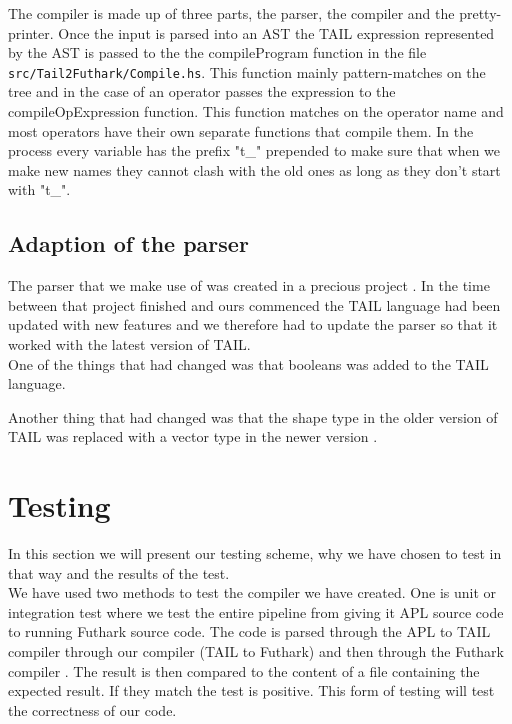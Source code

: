 \documentclass[11pt]{article}
\begin{document}
The compiler is made up of three parts, the parser, the compiler and the pretty-printer. Once the input is parsed into an AST the
TAIL expression represented by the AST is passed to the the compileProgram function in the file \\
{\tt src/Tail2Futhark/Compile.hs}.
This function mainly pattern-matches on the tree and in the case of an operator passes the expression to the compileOpExpression
function.
This function matches on the operator name and most operators have their own separate functions that compile them.
In the process every variable has the prefix "t\_" prepended to make sure that when we make new names they cannot clash
with the old ones as long as they don't start with "t\_".

\subsection{Adaption of the parser}

The parser that we make use of was created in a precious project \cite{APLACC}.
In the time between that project finished and ours commenced the TAIL language
had been updated with new features and we therefore had to update the parser so that it worked with the latest version of TAIL.\\

One of the things that had changed was that booleans was added to the TAIL language. %

Another thing that had changed was that the shape type in the older version of TAIL was replaced with a vector type in the newer version \cite{ElsmanDybdal:Array:2014}.\\

\section{Testing}
In this section we will present our testing scheme, why we have chosen to test in that way and the results of the test.\\

We have used two methods to test the compiler we have created.
One is unit or integration test where we test the entire pipeline from giving it APL source code to running Futhark source code.
The code is parsed through the APL to TAIL compiler \cite{ElsmanDybdal:Array:2014}
through our compiler (TAIL to Futhark) and then through the Futhark compiler \cite{TroelsHenriksen}.
The result is then compared to the content of a file containing the expected result.
If they match the test is positive. This form of testing will test the correctness of our code. \\
\end{document}
